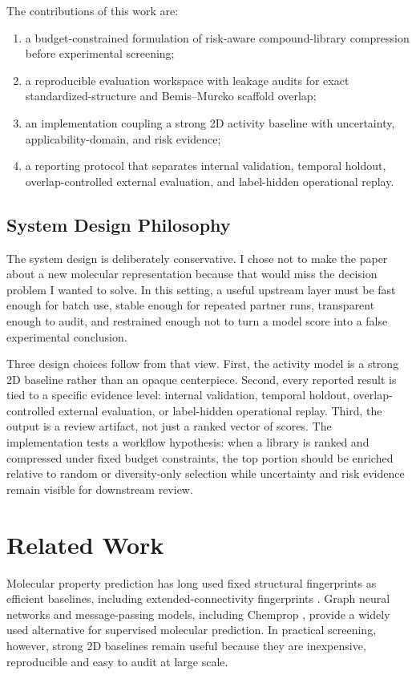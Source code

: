 \documentclass[manuscript=article]{achemso}
\begin{document}
The contributions of this work are:
\begin{enumerate}
  \item a budget-constrained formulation of risk-aware compound-library
        compression before experimental screening;
  \item a reproducible evaluation workspace with leakage audits for exact
        standardized-structure and Bemis--Murcko scaffold overlap;
  \item an implementation coupling a strong 2D activity baseline with
        uncertainty, applicability-domain, and risk evidence;
  \item a reporting protocol that separates internal validation, temporal
        holdout, overlap-controlled external evaluation, and label-hidden
        operational replay.
\end{enumerate}

\subsection{System Design Philosophy}
The system design is deliberately conservative. I chose not to make the paper
about a new molecular representation because that would miss the decision
problem I wanted to solve. In this setting, a useful upstream layer must be
fast enough for batch use, stable enough for repeated partner runs,
transparent enough to audit, and restrained enough not to turn a model score
into a false experimental conclusion.

Three design choices follow from that view. First, the activity model is a
strong 2D baseline rather than an opaque centerpiece. Second, every reported
result is tied to a specific evidence level: internal validation, temporal
holdout, overlap-controlled external evaluation, or label-hidden operational
replay. Third, the output is a review artifact, not just a ranked vector of
scores. The implementation tests a workflow hypothesis: when a library is
ranked and compressed under fixed budget constraints, the top portion should
be enriched relative to random or diversity-only selection while uncertainty
and risk evidence remain visible for downstream review.

\section{Related Work}
Molecular property prediction has long used fixed structural fingerprints as
efficient baselines, including extended-connectivity fingerprints
\cite{ecfp}. Graph neural networks and message-passing models, including
Chemprop \cite{chemprop}, provide a widely used alternative for supervised
molecular prediction. In practical screening, however, strong 2D baselines
remain useful because they are inexpensive, reproducible and easy to
audit at large scale.
\end{document}
